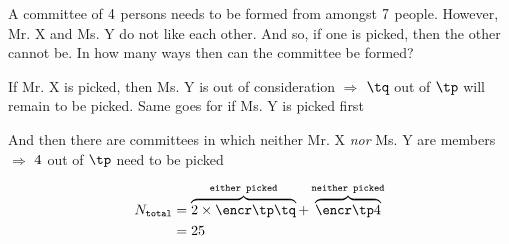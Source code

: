 




\question[2] A committee of $4$ persons needs to be formed from amongst $7$ people. However, 
Mr. X and Ms. Y do not like each other. And so, if one is picked, then the other cannot be. In how many 
ways then can the committee be formed?


\watchout[-30pt]

\ifprintanswers
\fi 

\begin{solution}[\mcq]
	If Mr. X is picked, then Ms. Y is out of consideration $\Rightarrow$ $\tq$ out of $\tp$ 
	will remain to be picked. Same goes for if Ms. Y is picked first

  And then there are committees in which neither Mr. X \textit{nor} Ms. Y are members $\Rightarrow$ 
  $4$ out of $\tp$ need to be picked
	
	\begin{align}
		N_{\texttt{total}} &= \overbrace{2\times\encr\tp\tq}^{\texttt{either picked}} + 
    \overbrace{\encr\tp\vbone}^{\texttt{neither picked}} \\
		&= \vbthree
	\end{align}
\end{solution}
